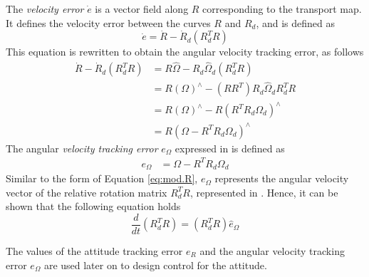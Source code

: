 The \textit{velocity error} $ \dot{e} $ is a vector field along $ R $ corresponding to the transport map.
It defines the velocity error between the curves $ R$ and $ R_d$, and is defined as
\begin{equation}\label{eq:con.dote}
\dot{e}=\dot{R}-\dot{R}_d(R_d^TR)
\end{equation}
This equation is rewritten to obtain the angular velocity tracking error, as follows
\begin{equation}\label{key}
\begin{aligned}
\dot{R}-\dot{R}_d(R_d^TR) &=R\hat{\Omega}-R_d\hat{\Omega}_d(R_d^TR) \\
&=R(\Omega)^\wedge-(RR^T)R_d\hat{\Omega}_dR_d^TR\\
&=R(\Omega)^\wedge-R(R^TR_d{\Omega}_d)^\wedge \\
&=R(\Omega-R^TR_d{\Omega}_d)^\wedge 
\end{aligned}
\end{equation}
The angular \textit{velocity tracking error} $ e_{\Omega} $ expressed in \BF  is defined as
\begin{align}\label{eq:con.eOmega}
e_\Omega&=\Omega- R^TR_d\Omega_d
\end{align}
Similar to the form of Equation \ref{eq:mod.R}, $ e_\Omega $ represents the angular velocity vector of the relative rotation matrix $ R_d^TR $, represented in \BF. Hence, it can be shown that the following equation holds
\begin{equation}\label{key}
\frac{d}{dt}(R^T_dR)=(R_d^TR)\hat{e}_\Omega
\end{equation}
%
%

The values of the  attitude tracking error $ e_R $ and the  angular velocity tracking error $ e_\Omega $ 
are used later on to design control for the  attitude.

